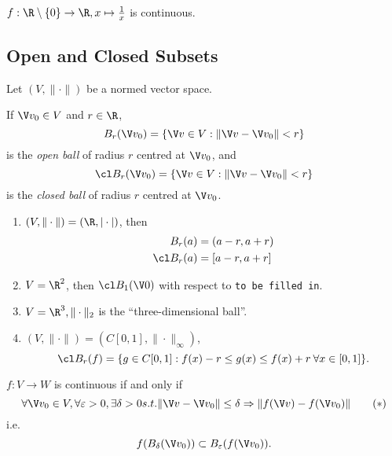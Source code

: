 \documentclass[a4paper]{article}
\theoremstyle{definition}
\begin{document}
\begin{eg}
  $f:\R \setminus \{0\} \to \R, x \mapsto \frac{1}{x}$ is continuous.
\end{eg}

\subsection{Open and Closed Subsets}

Let $(V, \|\cdot\|)$ be a normed vector space.

\begin{defi}
  If $\V v_0 \in V$ and $r \in \R$,
  \[
    B_r(\V v_0) = \{\V v\in V: \|\V v - \V v_0\| < r \}
  \]
  is the \emph{open ball} of radius $r$ centred at $\V v_0$, and
  \[
    \cl B_r(\V v_0) = \{\V v\in V: \|\V v - \V v_0\| < r \}
  \]
  is the \emph{closed ball} of radius $r$ centred at $\V v_0$.
\end{defi}

\begin{eg}\leavevmode
  \begin{enumerate}
  \item $(V, \|\cdot\|) = (\R, |\cdot|)$, then
    \begin{align*}
      B_r(a) &= (a-r, a+r) \\
      \cl B_r(a) &= [a-r, a+r] 
    \end{align*}
  \item $V=\R^2$, then $\cl B_1(\V 0)$ with respect to \texttt{to be filled in}.
\item $V = \R^3, \|\cdot\|_2$ is the ``three-dimensional ball''.
\item $(V, \|\cdot\|) = (C[0,1], \|\cdot\|_\infty)$,
  \[
    \cl B_r(f) = \{g\in C[0,1]: f(x)-r \leq g(x) \leq f(x) + r \: \forall x \in [0,1]\}.
  \]
  \end{enumerate}
\end{eg}

\begin{prop}
  $f:V\to W$ is continuous if and only if
  \begin{equation}
    \label{eqn:alternate continuity}
    \forall \V v_0 \in V, \forall \varepsilon>0, \exists \delta>0 s.t. \|\V v- \V v_0\| \leq \delta \Rightarrow \|f(\V v) - f(\V v_0)\| \tag{$\ast$}
    \end{equation}
  i.e.
  \[
    f(B_\delta(\V v_0)) \subset B_\varepsilon(f(\V v_0)).
    \]
\end{prop}
\end{document}
